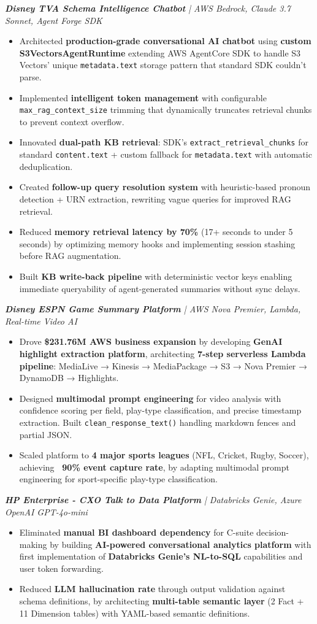 \documentclass[letterpaper,10pt]{article}
\newcommand{\resumeItem}[1]{
  \item\small{
    {#1 \vspace{-2pt}}
  }
}
\newcommand{\resumeItemListStart}{\begin{itemize}}
\newcommand{\resumeItemListEnd}{\end{itemize}\vspace{-5pt}}
\begin{document}
      \vspace{12pt}
      \textit{\small\textbf{Disney TVA Schema Intelligence Chatbot} | AWS Bedrock, Claude 3.7 Sonnet, Agent Forge SDK}
      \resumeItemListStart
        \resumeItem{Architected \textbf{production-grade conversational AI chatbot} using \textbf{custom S3VectorsAgentRuntime} extending AWS AgentCore SDK to handle S3 Vectors' unique \texttt{metadata.text} storage pattern that standard SDK couldn't parse.}
        \resumeItem{Implemented \textbf{intelligent token management} with configurable \texttt{max\_rag\_context\_size} trimming that dynamically truncates retrieval chunks to prevent context overflow.}
        \resumeItem{Innovated \textbf{dual-path KB retrieval}: SDK's \texttt{extract\_retrieval\_chunks} for standard \texttt{content.text} + custom fallback for \texttt{metadata.text} with automatic deduplication.}
        \resumeItem{Created \textbf{follow-up query resolution system} with heuristic-based pronoun detection + URN extraction, rewriting vague queries for improved RAG retrieval.}
        \resumeItem{Reduced \textbf{memory retrieval latency by 70\%} (17+ seconds to under 5 seconds) by optimizing memory hooks and implementing session stashing before RAG augmentation.}
        \resumeItem{Built \textbf{KB write-back pipeline} with deterministic vector keys enabling immediate queryability of agent-generated summaries without sync delays.}
      \resumeItemListEnd

      \vspace{12pt}
      \textit{\small\textbf{Disney ESPN Game Summary Platform} | AWS Nova Premier, Lambda, Real-time Video AI}
      \resumeItemListStart
        \resumeItem{Drove \textbf{\$231.76M AWS business expansion} by developing \textbf{GenAI highlight extraction platform}, architecting \textbf{7-step serverless Lambda pipeline}: MediaLive → Kinesis → MediaPackage → S3 → Nova Premier → DynamoDB → Highlights.}
        \resumeItem{Designed \textbf{multimodal prompt engineering} for video analysis with confidence scoring per field, play-type classification, and precise timestamp extraction. Built \texttt{clean\_response\_text()} handling markdown fences and partial JSON.}
        \resumeItem{Scaled platform to \textbf{4 major sports leagues} (NFL, Cricket, Rugby, Soccer), achieving \textbf{~90\% event capture rate}, by adapting multimodal prompt engineering for sport-specific play-type classification.}
      \resumeItemListEnd

      \vspace{12pt}
      \textit{\small\textbf{HP Enterprise - CXO Talk to Data Platform} | Databricks Genie, Azure OpenAI GPT-4o-mini}
      \resumeItemListStart
        \resumeItem{Eliminated \textbf{manual BI dashboard dependency} for C-suite decision-making by building \textbf{AI-powered conversational analytics platform} with first implementation of \textbf{Databricks Genie's NL-to-SQL} capabilities and user token forwarding.}
        \resumeItem{Reduced \textbf{LLM hallucination rate} through output validation against schema definitions, by architecting \textbf{multi-table semantic layer} (2 Fact + 11 Dimension tables) with YAML-based semantic definitions.}
      \resumeItemListEnd
\end{document}
